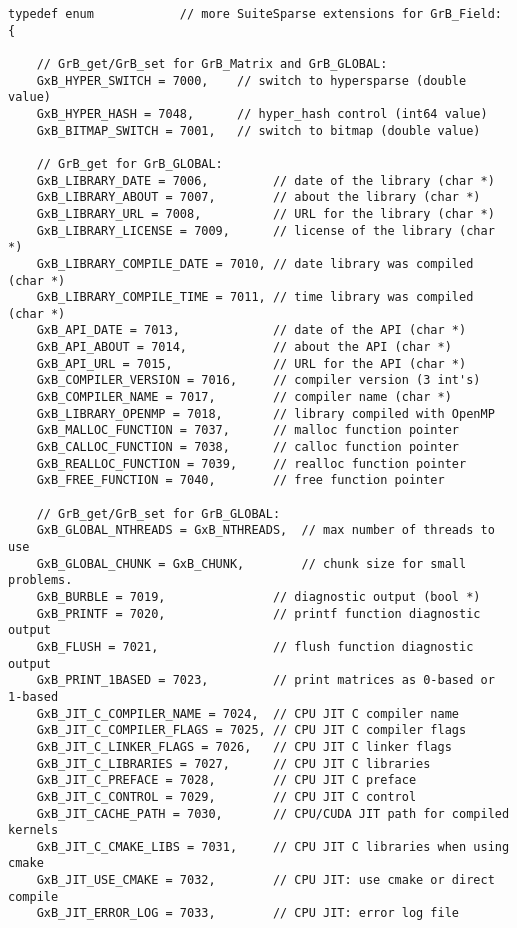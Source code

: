 {\begin{verbatim}
typedef enum            // more SuiteSparse extensions for GrB_Field:
{

    // GrB_get/GrB_set for GrB_Matrix and GrB_GLOBAL:
    GxB_HYPER_SWITCH = 7000,    // switch to hypersparse (double value)
    GxB_HYPER_HASH = 7048,      // hyper_hash control (int64 value)
    GxB_BITMAP_SWITCH = 7001,   // switch to bitmap (double value)

    // GrB_get for GrB_GLOBAL:
    GxB_LIBRARY_DATE = 7006,         // date of the library (char *)
    GxB_LIBRARY_ABOUT = 7007,        // about the library (char *)
    GxB_LIBRARY_URL = 7008,          // URL for the library (char *)
    GxB_LIBRARY_LICENSE = 7009,      // license of the library (char *)
    GxB_LIBRARY_COMPILE_DATE = 7010, // date library was compiled (char *)
    GxB_LIBRARY_COMPILE_TIME = 7011, // time library was compiled (char *)
    GxB_API_DATE = 7013,             // date of the API (char *)
    GxB_API_ABOUT = 7014,            // about the API (char *)
    GxB_API_URL = 7015,              // URL for the API (char *)
    GxB_COMPILER_VERSION = 7016,     // compiler version (3 int's)
    GxB_COMPILER_NAME = 7017,        // compiler name (char *)
    GxB_LIBRARY_OPENMP = 7018,       // library compiled with OpenMP
    GxB_MALLOC_FUNCTION = 7037,      // malloc function pointer
    GxB_CALLOC_FUNCTION = 7038,      // calloc function pointer
    GxB_REALLOC_FUNCTION = 7039,     // realloc function pointer
    GxB_FREE_FUNCTION = 7040,        // free function pointer

    // GrB_get/GrB_set for GrB_GLOBAL:
    GxB_GLOBAL_NTHREADS = GxB_NTHREADS,  // max number of threads to use
    GxB_GLOBAL_CHUNK = GxB_CHUNK,        // chunk size for small problems.
    GxB_BURBLE = 7019,               // diagnostic output (bool *)
    GxB_PRINTF = 7020,               // printf function diagnostic output
    GxB_FLUSH = 7021,                // flush function diagnostic output
    GxB_PRINT_1BASED = 7023,         // print matrices as 0-based or 1-based
    GxB_JIT_C_COMPILER_NAME = 7024,  // CPU JIT C compiler name
    GxB_JIT_C_COMPILER_FLAGS = 7025, // CPU JIT C compiler flags
    GxB_JIT_C_LINKER_FLAGS = 7026,   // CPU JIT C linker flags
    GxB_JIT_C_LIBRARIES = 7027,      // CPU JIT C libraries
    GxB_JIT_C_PREFACE = 7028,        // CPU JIT C preface
    GxB_JIT_C_CONTROL = 7029,        // CPU JIT C control
    GxB_JIT_CACHE_PATH = 7030,       // CPU/CUDA JIT path for compiled kernels
    GxB_JIT_C_CMAKE_LIBS = 7031,     // CPU JIT C libraries when using cmake
    GxB_JIT_USE_CMAKE = 7032,        // CPU JIT: use cmake or direct compile
    GxB_JIT_ERROR_LOG = 7033,        // CPU JIT: error log file


\end{verbatim}}
